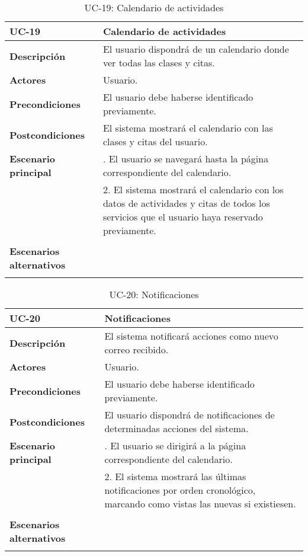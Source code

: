 \begin{table}[H]
  \begin{center}
    \begin{tabularx}{16.4cm}{|l|X|}
      \hline
      \textbf{UC-19} & \textbf{Calendario de actividades}\\
      \hline
      \textbf{Descripción} & El usuario dispondrá de un calendario donde ver todas las clases y citas. \\
      \hline
      \textbf{Actores} & Usuario.\\
      \hline
      \textbf{Precondiciones} & El usuario debe haberse identificado previamente.\\
      \hline
      \textbf{Postcondiciones} & El sistema mostrará el calendario con las clases y citas del usuario.\\
      \hline
      \textbf{Escenario principal} & \smallskip 1. El usuario se navegará hasta la página correspondiente del calendario.\\
      & 2. El sistema mostrará el calendario con los datos de actividades y citas de todos los servicios que el usuario haya reservado previamente.\\
      & \\
      \hline
      \textbf{Escenarios alternativos} & \\
      & \\
      \hline
    \end{tabularx}
    \caption{UC-19: Calendario de actividades}
  \end{center}
\end{table}


\begin{table}[H]
  \begin{center}
    \begin{tabularx}{16.4cm}{|l|X|}
      \hline
      \textbf{UC-20} & \textbf{Notificaciones}\\
      \hline
      \textbf{Descripción} & El sistema notificará acciones como nuevo correo recibido. \\
      \hline
      \textbf{Actores} & Usuario.\\
      \hline
      \textbf{Precondiciones} & El usuario debe haberse identificado previamente.\\
      \hline
      \textbf{Postcondiciones} & El usuario dispondrá de notificaciones de determinadas acciones del sistema. \\
      \hline
      \textbf{Escenario principal} & \smallskip 1. El usuario se dirigirá a la página correspondiente del calendario.\\
      & 2. El sistema mostrará las últimas notificaciones por orden cronológico, marcando como vistas las nuevas si existiesen.\\
      & \\
      \hline
      \textbf{Escenarios alternativos} & \\
      & \\
      \hline
    \end{tabularx}
    \caption{UC-20: Notificaciones}
  \end{center}
\end{table}


